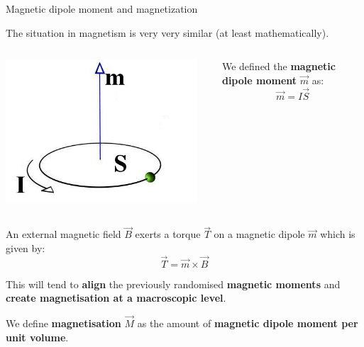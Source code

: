 \begin{frame}{Magnetic dipole moment and magnetization}

The situation in magnetism is very very similar (at least mathematically).\\
\vspace{0.2cm}

\begin{columns}
  \begin{column}{0.25\textwidth}
    \begin{center}
      \includegraphics[width=0.95\textwidth]{./images/schematics/magnetic_dipole_moment_00.jpg}\\
    \end{center}
  \end{column}
  \begin{column}{0.70\textwidth}
    We defined the {\bf magnetic dipole moment} $\vec{m}$ as:
   \begin{equation*}
     \vec{m} = I \vec{S}
   \end{equation*}
  \end{column}
\end{columns}

\vspace{0.2cm}

An external magnetic field $\vec{B}$ exerts a torque $\vec{T}$ on a magnetic dipole $\vec{m}$ which is given by:
\begin{equation*}
  \vec{T} = \vec{m} \times \vec{B}
\end{equation*}

This will tend to {\bf align} the previously randomised {\bf magnetic moments}
and {\bf create magnetisation at a macroscopic level}.\\
\vspace{0.2cm}

We define {\bf magnetisation} $\vec{M}$ as the amount of {\bf magnetic dipole moment per unit volume}.

\end{frame}

